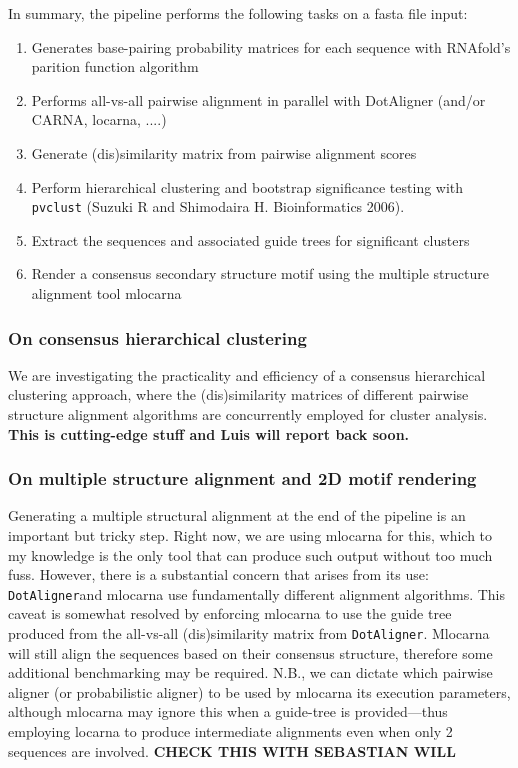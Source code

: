 \documentclass[a4paper,twoside]{article}
\newcommand\dotaligner{\texttt{DotAligner}}
\newcommand\pvclust{\texttt{pvclust}}
\begin{document}
In summary, the pipeline performs the following tasks on a fasta file input:
\begin{enumerate}
\item Generates base-pairing probability matrices for each sequence with RNAfold's parition function algorithm 
\item Performs all-vs-all pairwise alignment in parallel with DotAligner (and/or CARNA, locarna, ....)
\item Generate (dis)similarity matrix from pairwise alignment scores 
\item Perform hierarchical clustering and bootstrap significance testing with \pvclust{} (Suzuki R and Shimodaira H. Bioinformatics 2006).
\item Extract the sequences and associated guide trees for significant clusters
\item Render a consensus secondary structure motif using the multiple structure alignment tool mlocarna
\end{enumerate}


\subsubsection{ On consensus hierarchical clustering }

We are investigating the practicality and efficiency of a consensus
hierarchical clustering approach, where the (dis)similarity matrices of
different pairwise structure alignment algorithms are concurrently employed for
cluster analysis. \textbf{This is cutting-edge stuff and Luis will report back
soon. }


\subsubsection{ On multiple structure alignment and 2D motif rendering }

Generating a multiple structural alignment at the end of the pipeline is an
important but tricky step.  Right now, we are using mlocarna for this, which to
my knowledge is the only tool that can produce such output without too much
fuss. However, there is a substantial concern that arises from its use:
\dotaligner and mlocarna use fundamentally different alignment algorithms. This
caveat is somewhat resolved by enforcing mlocarna to use the guide tree
produced from the all-vs-all (dis)similarity matrix from \dotaligner . Mlocarna
will still align the sequences based on their consensus structure, therefore
some additional benchmarking may be required. N.B., we can dictate which
pairwise aligner (or probabilistic aligner) to be used by mlocarna its
execution parameters, although mlocarna may ignore this when a guide-tree is
provided---thus employing locarna to produce intermediate alignments even when
only 2 sequences are involved. \textbf{CHECK THIS WITH SEBASTIAN WILL }
\end{document}

